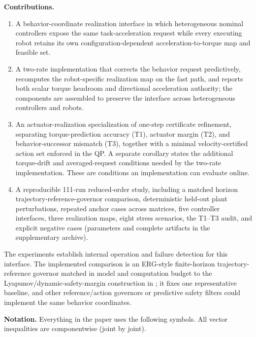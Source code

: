 \documentclass[journal]{IEEEtran}
\begin{document}
\textbf{Contributions.}
\begin{enumerate}
\item A behavior-coordinate realization interface in which heterogeneous nominal controllers expose the same task-acceleration request while every executing robot retains its own configuration-dependent acceleration-to-torque map and feasible set.
\item A two-rate implementation that corrects the behavior request predictively, recomputes the robot-specific realization map on the fast path, and reports both scalar torque headroom and directional acceleration authority; the components are assembled to preserve the interface across heterogeneous controllers and robots.
\item An actuator-realization specialization of one-step certificate refinement, separating torque-prediction accuracy (T1), actuator margin (T2), and behavior-successor mismatch (T3), together with a minimal velocity-certified action set enforced in the QP. A separate corollary states the additional torque-drift and averaged-request conditions needed by the two-rate implementation. These are conditions an implementation can evaluate online.
\item A reproducible 111-run reduced-order study, including a matched horizon trajectory-reference-governor comparison, deterministic held-out plant perturbations, repeated anchor cases across matrices, five controller interfaces, three realization maps, eight stress scenarios, the T1--T3 audit, and explicit negative cases (parameters and complete artifacts in the supplementary archive).
\end{enumerate}

The experiments establish internal operation and failure detection for this interface. The implemented comparison is an ERG-style
finite-horizon trajectory-reference governor matched in model and computation budget to the
Lyapunov/dynamic-safety-margin construction in \cite{r17}; it fixes one representative baseline, and other
reference/action governors or predictive safety filters could implement the same behavior coordinates.

\textbf{Notation.} Everything in the paper uses the following symbols. All vector inequalities are componentwise (joint by joint).
\end{document}
